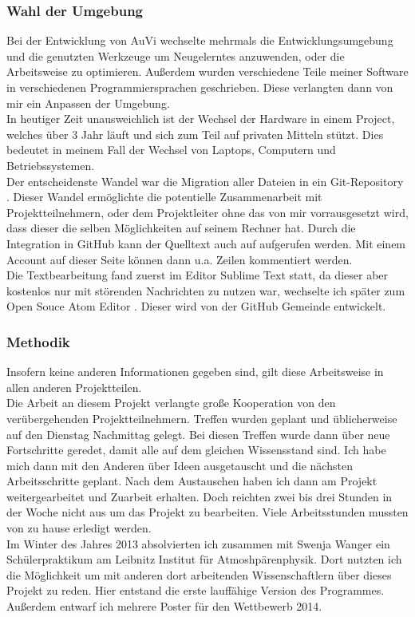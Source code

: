 \subsubsection{Wahl der Umgebung}\label{sec:ent} %
Bei der Entwicklung von AuVi wechselte mehrmals die Entwicklungsumgebung und die
genutzten Werkzeuge um Neugelerntes anzuwenden, oder die Arbeitsweise zu optimieren.
Außerdem wurden verschiedene Teile meiner Software in verschiedenen Programmiersprachen
geschrieben. Diese verlangten dann von mir ein Anpassen der Umgebung.\\
In heutiger Zeit unausweichlich ist der Wechsel der Hardware in einem Project,
welches über 3 Jahr läuft und sich zum Teil auf privaten Mitteln stützt. Dies
bedeutet in meinem Fall der Wechsel von Laptops, Computern und Betriebssystemen.\\
Der entscheidenste Wandel war die Migration aller Dateien in ein Git-Repository \cite{gitrepo}.
Dieser Wandel ermöglichte die potentielle Zusammenarbeit mit Projektteilnehmern, oder
dem Projektleiter ohne das von mir vorrausgesetzt wird, dass dieser die selben Möglichkeiten
auf seinem Rechner hat. Durch die Integration in GitHub kann der Quelltext auch auf
 aufgerufen werden. Mit einem Account auf dieser
Seite können dann u.a. Zeilen kommentiert werden. \\
Die Textbearbeitung fand zuerst im Editor Sublime Text \cite{sublime} statt, da dieser
aber kostenlos nur mit störenden Nachrichten zu nutzen war, wechselte ich später
zum Open Souce Atom Editor \cite{atomio}. Dieser wird von der GitHub Gemeinde entwickelt.

\subsubsection{Methodik} %
Insofern keine anderen Informationen gegeben sind,
gilt diese Arbeitsweise in allen anderen Projektteilen. \\
Die Arbeit an diesem Projekt verlangte große Kooperation
von den verübergehenden Projektteilnehmern.
Treffen wurden geplant und üblicherweise auf den Dienstag Nachmittag gelegt.
Bei diesen Treffen wurde dann über neue Fortschritte geredet,
damit alle auf dem gleichen Wissensstand sind.
Ich habe mich dann mit den Anderen über Ideen ausgetauscht
und die nächsten Arbeitsschritte geplant.
Nach dem Austauschen haben ich dann am Projekt weitergearbeitet und Zuarbeit erhalten.
Doch reichten zwei bis drei Stunden in der Woche nicht aus um das Projekt zu bearbeiten.
Viele Arbeitsstunden mussten von zu hause erledigt werden.\\
Im Winter des Jahres 2013 absolvierten ich zusammen mit Swenja Wanger ein Schülerpraktikum am
Leibnitz Institut für Atmoshpärenphysik.
Dort nutzten ich die Möglichkeit um mit anderen dort arbeitenden
Wissenschaftlern über dieses Projekt zu reden.
Hier entstand die erste lauffähige Version des Programmes.
Außerdem entwarf ich mehrere Poster für den \jf Wettbewerb 2014.

